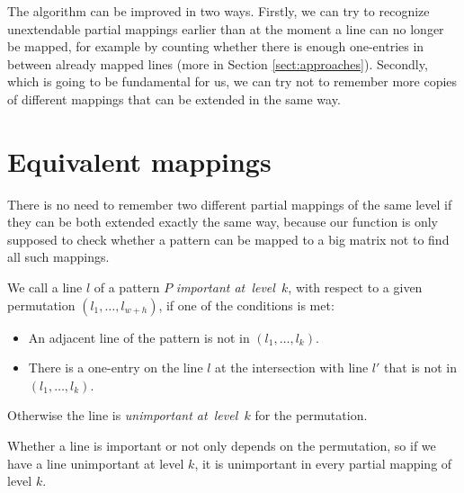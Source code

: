 The algorithm can be improved in two ways. Firstly, we can try to recognize unextendable partial mappings earlier than at the moment a line can no longer be mapped, for example by counting whether there is enough one-entries in between already mapped lines (more in Section \ref{sect:approaches}). Secondly, which is going to be fundamental for us, we can try not to remember more copies of different mappings that can be extended in the same way.

\section{Equivalent mappings}
There is no need to remember two different partial mappings of the same level if they can be both extended exactly the same way, because our function is only supposed to check whether a pattern can be mapped to a big matrix not to find all such mappings.
\begin{defn}
We call a line $l$ of a pattern $P$ \emph{important at~level~$k$}, with respect to a given permutation $(l_1,\dots,l_{w+h})$, if one of the conditions is met:
\begin{itemize}
\item An adjacent line of the pattern is not in $(l_1,\dots,l_k)$.
\item There is a one-entry on the line $l$ at the intersection with line $l'$ that is not in $(l_1,\dots,l_k)$.
\end{itemize}
Otherwise the line is \emph{unimportant at~level~$k$} for the permutation.
\end{defn}
Whether a line is important or not only depends on the permutation, so if we have a line unimportant at level $k$, it is unimportant in every partial mapping of level $k$.

